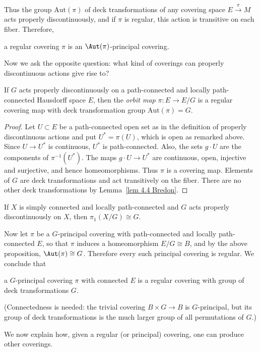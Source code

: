 Thus the group $\mathrm{Aut}(\pi)$ of deck transformations of any covering space $E\overset{\pi}{\to}M$ acts properly discontinuously, and if $\pi$ is regular, this action is transitive on each fiber. Therefore,
\begin{center}
    a regular covering $\pi$ is an $\Aut(\pi)$-principal covering.
\end{center}

Now we ask the opposite question: what kind of coverings can properly discontinuous actions give rise to?

\begin{prop}
    If $G$ acts properly discontinuously on a path-connected and locally path-connected Hausdorff space $E$, then the \emph{orbit map} $\pi:E\to E\slash G$ is a regular covering map with deck transformation group $\mathrm{Aut}(\pi)=G$.
\end{prop}
\begin{proof}
    Let $U\subset E$ be a path-connected open set as in the definition of properly discontinuous actions and put $U^\ast =\pi(U)$, which is open as remarked above. Since $U\to U^\ast$ is continuous, $U^\ast$ is path-connected. Also, the sets $g\cdot U$ are the components of $\pi^{-1}(U^\ast)$. The maps $g\cdot U\to U^\ast$ are continuous, open, injective and surjective, and hence homeomorphisms. Thus $\pi$ is a covering map. Elements of $G$ are deck transformations and act transitively on the fiber. There are no other deck transformations by Lemma~\ref{lem 4.4 Bredon}.
\end{proof}
\begin{cor}
    If $X$ is simply connected and locally path-connected and $G$ acts properly discontinuously on $X$, then $\pi_1(X\slash G)\cong G$.
\end{cor}


Now let $\pi$ be a $G$-principal covering with path-connected and locally path-connected $E$, so that $\pi$ induces a homeomorphism $E\slash G\cong B$, and by the above proposition, $\Aut(\pi)\cong G$. Therefore every such principal covering is regular. We conclude that
\begin{center}
    a $G$-principal covering $\pi$ with connected $E$ is a regular covering with group of deck transformations $G$.
\end{center}
(Connectedness is needed: the trivial covering $B\times G\to B$ is $G$-principal, but its group of deck transformations is the much larger group of all permutations of $G$.)


We now explain how, given a regular (or principal) covering, one can produce other coverings.

